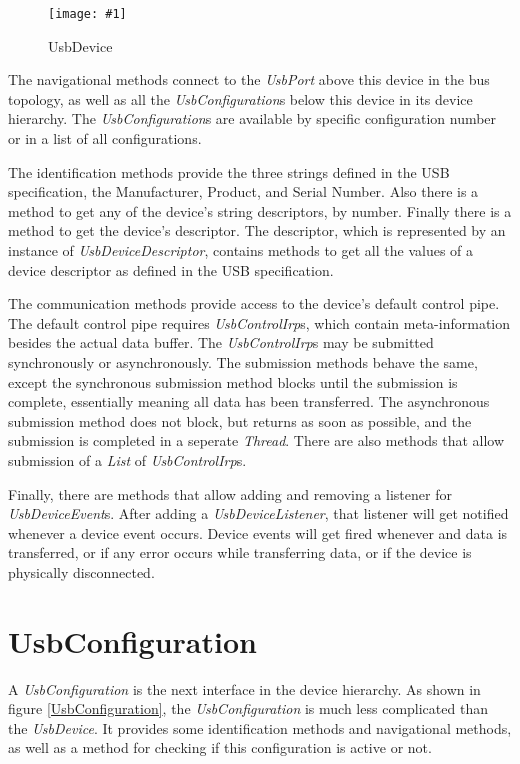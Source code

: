 \documentclass{article}
\newcommand{\myclass}[1]{\emph{#1}}
\newcommand{\myinterface}[1]{\emph{#1}}
\newcommand{\mysectionend}[0]{\vfill\pagebreak[1]}
\newcommand{\myfigure}[3]{\begin{figure}[htbp]\centering\texttt{[image: \#1]}\caption{#2}\label{#3}\end{figure}}
\begin{document}
\myfigure{figs/UsbDevice}{UsbDevice}{UsbDevice}

The navigational methods connect to the \myinterface{UsbPort} above this
device in the bus topology, as well as all the \myinterface{UsbConfiguration}s
below this device in its device hierarchy.  The \myinterface{UsbConfiguration}s
are available by specific configuration number or in a list of
all configurations.

The identification methods provide the three strings defined in
the USB specification, the Manufacturer, Product, and Serial Number.
Also there is a method to get any of the device's string descriptors,
by number.  Finally there is a method to get the device's descriptor.
The descriptor, which is represented by an instance of \myinterface{UsbDeviceDescriptor},
contains methods to get all the values of a device descriptor as
defined in the USB specification.

The communication methods provide access to the device's default control
pipe.  The default control pipe requires \myinterface{UsbControlIrp}s, which contain
meta-information besides the actual data buffer.  The \myinterface{UsbControlIrp}s
may be submitted synchronously or asynchronously.  The submission methods
behave the same, except the synchronous submission method blocks until
the submission is complete, essentially meaning all data has been transferred.
The asynchronous submission method does not block, but returns as soon as
possible, and the submission is completed in a seperate \myclass{Thread}.  There
are also methods that allow submission of a \myinterface{List} of \myinterface{UsbControlIrp}s.

Finally, there are methods that allow adding and removing a listener for
\myclass{UsbDeviceEvent}s.  After adding a \myinterface{UsbDeviceListener}, that listener will
get notified whenever a device event occurs.  Device events will get
fired whenever and data is transferred, or if any error occurs while
transferring data, or if the device is physically disconnected.

\mysectionend


\section{UsbConfiguration}

A \myinterface{UsbConfiguration} is the next interface in the device hierarchy.
As shown in figure \ref{UsbConfiguration}, the \myinterface{UsbConfiguration}
is much less complicated than the \myinterface{UsbDevice}.  It provides some
identification methods and navigational methods, as well as a
method for checking if this configuration is active or not.
\end{document}
